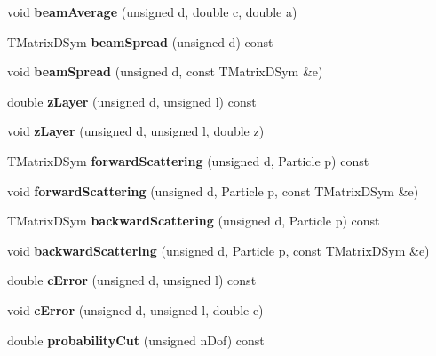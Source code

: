 \begin{DoxyCompactItemize}
\item 
void {\bfseries beam\-Average} (unsigned d, double c, double a)\label{classTBTrack_1_1FitConstants_a973118ce9e89a90aaa0453ad2693dc41}

\item 
T\-Matrix\-D\-Sym {\bfseries beam\-Spread} (unsigned d) const \label{classTBTrack_1_1FitConstants_a92a42dc3339b8d8812aaf9b3e96d757d}

\item 
void {\bfseries beam\-Spread} (unsigned d, const T\-Matrix\-D\-Sym \&e)\label{classTBTrack_1_1FitConstants_ad904d24cd02a69767b6935e5a3131aa2}

\item 
double {\bfseries z\-Layer} (unsigned d, unsigned l) const \label{classTBTrack_1_1FitConstants_a48d3c08ed8a147b4fe34bb0671650fda}

\item 
void {\bfseries z\-Layer} (unsigned d, unsigned l, double z)\label{classTBTrack_1_1FitConstants_afb9283b46152570709ecf4e2ceba940a}

\item 
T\-Matrix\-D\-Sym {\bfseries forward\-Scattering} (unsigned d, Particle p) const \label{classTBTrack_1_1FitConstants_a5d182698ad7f662247a7f9bf15662cd7}

\item 
void {\bfseries forward\-Scattering} (unsigned d, Particle p, const T\-Matrix\-D\-Sym \&e)\label{classTBTrack_1_1FitConstants_a1ba9942b8faf3f662fd5002a9b2f9d29}

\item 
T\-Matrix\-D\-Sym {\bfseries backward\-Scattering} (unsigned d, Particle p) const \label{classTBTrack_1_1FitConstants_aa2760e9bcaf3ca95fd18d111c2789544}

\item 
void {\bfseries backward\-Scattering} (unsigned d, Particle p, const T\-Matrix\-D\-Sym \&e)\label{classTBTrack_1_1FitConstants_ae3c4ce5580e332d5bcf1c53077f130f7}

\item 
double {\bfseries c\-Error} (unsigned d, unsigned l) const \label{classTBTrack_1_1FitConstants_aa59b427cb93906ae61d18515e656ea05}

\item 
void {\bfseries c\-Error} (unsigned d, unsigned l, double e)\label{classTBTrack_1_1FitConstants_aaa2f3eef3f50ce8ef1c3be75268024c7}

\item 
double {\bfseries probability\-Cut} (unsigned n\-Dof) const \label{classTBTrack_1_1FitConstants_a05ec4b2aba5904d2ba510d5b237e740a}


\end{DoxyCompactItemize}
